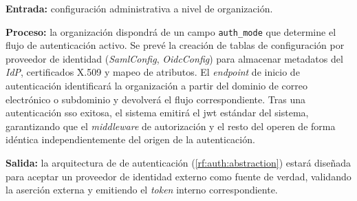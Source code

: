 \begin{functional}
    \textbf{Entrada:} configuración administrativa a nivel de organización.

    \textbf{Proceso:} la organización dispondrá de un campo \texttt{auth\_mode} que
    determine el flujo de autenticación activo. Se prevé la creación de tablas de
    configuración por proveedor de identidad (\textit{SamlConfig}, \textit{OidcConfig})
    para almacenar metadatos del \textit{IdP}, certificados X.509 y mapeo de atributos.
    El \textit{endpoint} de inicio de autenticación identificará la organización a partir
    del dominio de correo electrónico o subdominio y devolverá el flujo correspondiente.
    Tras una autenticación \acs{sso} exitosa, el sistema emitirá el \acs{jwt} estándar del
    sistema, garantizando que el \textit{middleware} de autorización y el resto del
     operen de forma idéntica independientemente del origen de la
    autenticación.

    \textbf{Salida:} la arquitectura de  de autenticación
    (\cref{rf:auth:abstraction}) estará diseñada para aceptar un proveedor de identidad
    externo como fuente de verdad, validando la aserción externa y emitiendo el
    \textit{token} interno correspondiente.

\end{functional}

